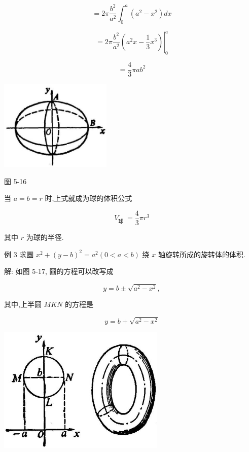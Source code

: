 \documentclass[lang=cn,newtx,10pt,scheme=chinese]{elegantbook}
\begin{document}
\[
= {2\pi }\frac{{b}^{2}}{{a}^{2}}{\int }_{0}^{a}\left( {{a}^{2} - {x}^{2}}\right) {dx}
\]

\[
= {\left. 2\pi \frac{{b}^{2}}{{a}^{2}}\left( {a}^{2}x - \frac{1}{3}{x}^{3}\right) \right| }_{0}^{a}
\]

\[
= \frac{4}{3}{\pi a}{b}^{2}
\]

\begin{center}
\includegraphics[max width=0.4\textwidth]{images/01912c18-5c3f-733d-b775-749ba9897a9d_238_905216.jpg}
\end{center}

图 5-16

当 \(a = b = r\) 时,上式就成为球的体积公式

\[
{V}_{\text{球 }} = \frac{4}{3}\pi {r}^{3}
\]

其中 \(r\) 为球的半径.

例 3 求圆 \({x}^{2} + {\left( y - b\right) }^{2} = {a}^{2}\left( {0 < a < b}\right)\) 绕 \(x\) 轴旋转所成的旋转体的体积.

解: 如图 5-17, 圆的方程可以改写成

\[
y = b \pm \sqrt{{a}^{2} - {x}^{2}},
\]

其中,上半圆 \({MKN}\) 的方程是

\[
y = b + \sqrt{{a}^{2} - {x}^{2}}
\]

\begin{center}
\includegraphics[max width=0.6\textwidth]{images/01912c18-5c3f-733d-b775-749ba9897a9d_239_464014.jpg}
\end{center}
\end{document}
